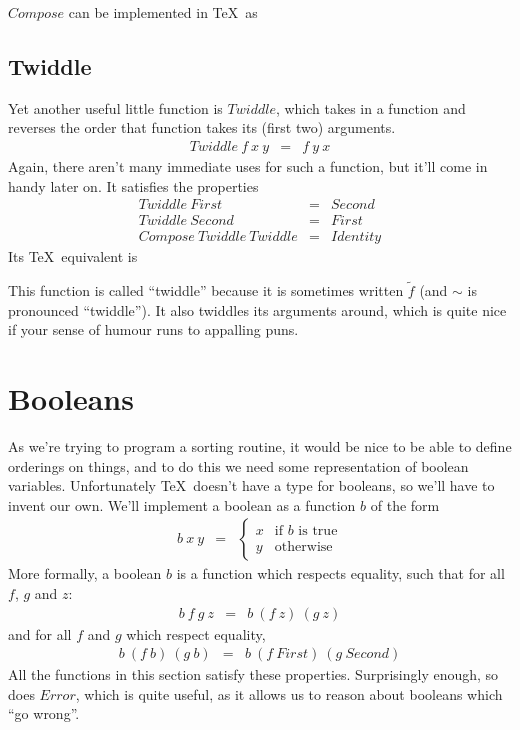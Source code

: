 $Compose$ can be implemented in \TeX\ as
\begin{TeXcode}
\def\Compose#1#2#3{#1{#2{#3}}}
\end{TeXcode}

\subsection{Twiddle}

Yet another useful little function is $Twiddle$, which takes in 
a function and reverses the order that function takes its (first two)
arguments.
\begin{eqnarray*}
   Twiddle~f~x~y  &  =  &  f~y~x
\end{eqnarray*}
Again, there aren't many immediate uses for such a function, but it'll
come in handy later on.  It satisfies the properties
\begin{eqnarray*}
              Twiddle~First  &  =  &  Second  \\
             Twiddle~Second  &  =  &  First  \\
    Compose~Twiddle~Twiddle  &  =  &  Identity
\end{eqnarray*}
Its \TeX\ equivalent is
\begin{TeXcode}
\def\Twiddle#1#2#3{#1{#3}{#2}}
\end{TeXcode}
This function is called ``twiddle'' because it is sometimes written
$\widetilde f$ (and $\sim$ is pronounced ``twiddle'').  
It also twiddles its arguments around,
which is quite nice if your sense of humour runs to appalling puns.

\section{Booleans}

As we're trying to program a sorting routine, it would be nice to
be able to define orderings on things, and to do this we need some
representation of boolean variables.  Unfortunately \TeX\ doesn't have a type
for booleans, so we'll have to invent our own.  We'll
implement a boolean as a function $b$ of the form
\begin{eqnarray*}
   b~x~y  &  
   =  &  
   \left\{
      \begin{array}{ll}
         x  &  \mbox{if $b$ is true}  \\
         y  &  \mbox{otherwise}
      \end{array}
   \right.
\end{eqnarray*}
More formally, a 
boolean $b$ is a function which respects equality,
such that for all $f$, $g$ and $z$:
\begin{eqnarray*}
   b~f~g~z  &  =  &  b~(f~z)~(g~z)
\end{eqnarray*}
and for all $f$ and $g$ which respect equality,
\begin{eqnarray*}
   b~(f~b)~(g~b)  &  =  &  b~(f~First)~(g~Second)
\end{eqnarray*}
All the functions in this section satisfy these properties.  Surprisingly
enough, so does $Error$, which is quite useful, as it allows us to 
reason about booleans which ``go wrong''.  

